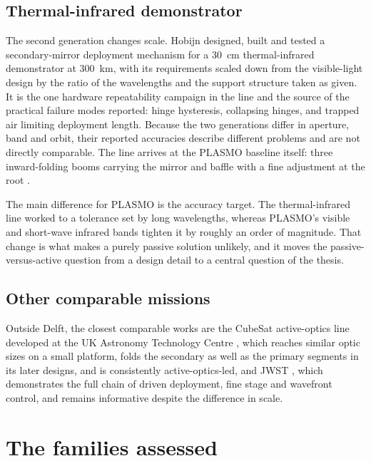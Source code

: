 \subsection{Thermal-infrared demonstrator}

The second generation changes scale. Hobijn \cite{hobijn_design_2023} designed, built and tested a secondary-mirror deployment mechanism for a \SI{30}{\centi\meter} thermal-infrared demonstrator at \SI{300}{\kilo\meter}, with its requirements scaled down from the visible-light design by the ratio of the wavelengths and the support structure taken as given. It is the one hardware repeatability campaign in the line and the source of the practical failure modes reported: hinge hysteresis, collapsing hinges, and trapped air limiting deployment length. Because the two generations differ in aperture, band and orbit, their reported accuracies describe different problems and are not directly comparable. The line arrives at the PLASMO baseline itself: three inward-folding booms carrying the mirror and baffle with a fine adjustment at the root \cite{bouwmeester_enabling_2023}.

The main difference for PLASMO is the accuracy target. The thermal-infrared line worked to a tolerance set by long wavelengths, whereas PLASMO's visible and short-wave infrared bands tighten it by roughly an order of magnitude. That change is what makes a purely passive solution unlikely, and it moves the passive-versus-active question from a design detail to a central question of the thesis.

\subsection{Other comparable missions}

Outside Delft, the closest comparable works are the CubeSat active-optics line developed at the UK Astronomy Technology Centre \cite{schwartz_laboratory_2018, schwartz_high-resolution_2020, schwartz_active_2021, schwartz_6u_2022, schwartz_high-resolution_2025}, which reaches similar optic sizes on a small platform, folds the secondary as well as the primary segments in its later designs, and is consistently active-optics-led, and JWST \cite{lightsey_james_2012}, which demonstrates the full chain of driven deployment, fine stage and wavefront control, and remains informative despite the difference in scale.


\section{The families assessed}
\label{sec:families-assessed}

